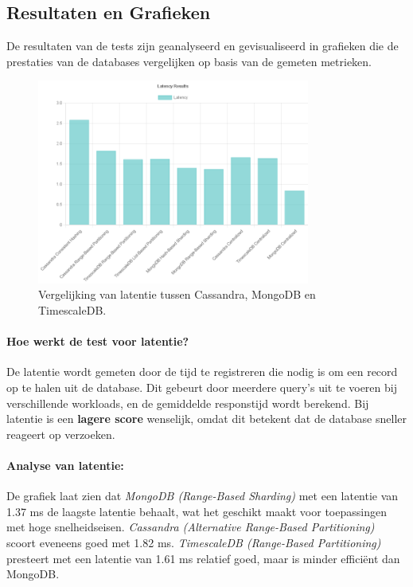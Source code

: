 \subsection{Resultaten en Grafieken}
De resultaten van de tests zijn geanalyseerd en gevisualiseerd in grafieken die de prestaties van de databases vergelijken op basis van de gemeten metrieken.

\begin{figure}[H]
	\centering
	\includegraphics[width=0.8\textwidth]{Latency.png}
	\caption{Vergelijking van latentie tussen Cassandra, MongoDB en TimescaleDB.}
	\label{fig:latency-comparison}
\end{figure}

\paragraph{Hoe werkt de test voor latentie?} 
De latentie wordt gemeten door de tijd te registreren die nodig is om een record op te halen uit de database. Dit gebeurt door meerdere query's uit te voeren bij verschillende workloads, en de gemiddelde responstijd wordt berekend. Bij latentie is een \textbf{lagere score} wenselijk, omdat dit betekent dat de database sneller reageert op verzoeken.

\paragraph{Analyse van latentie:}
De grafiek laat zien dat \textit{MongoDB (Range-Based Sharding)} met een latentie van 1.37 ms de laagste latentie behaalt, wat het geschikt maakt voor toepassingen met hoge snelheidseisen. \textit{Cassandra (Alternative Range-Based Partitioning)} scoort eveneens goed met 1.82 ms. \textit{TimescaleDB (Range-Based Partitioning)} presteert met een latentie van 1.61 ms relatief goed, maar is minder efficiënt dan MongoDB.

